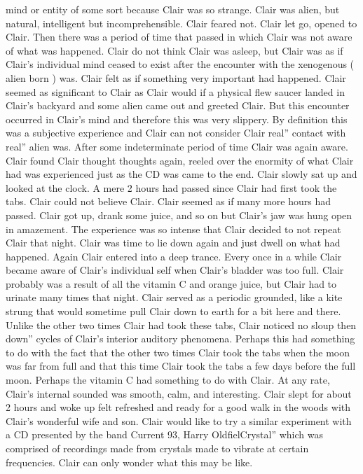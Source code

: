 \documentclass[12pt]{book}
\begin{document}
mind or entity of some sort because Clair was so strange. Clair was alien, but natural, intelligent but incomprehensible. Clair feared not. Clair let go, opened to Clair. Then there was a period of time that passed in which Clair was not aware of what was happened. Clair do not think Clair was asleep, but Clair was as if Clair's individual mind ceased to exist after the encounter with the xenogenous ( alien born ) was. Clair felt as if something very important had happened. Clair seemed as significant to Clair as Clair would if a physical flew saucer landed in Clair's backyard and some alien came out and greeted Clair. But this encounter occurred in Clair's mind and therefore this was very slippery. By definition this was a subjective experience and Clair can not consider Clair real'' contact with real'' alien was. After some indeterminate period of time Clair was again aware. Clair found Clair thought thoughts again, reeled over the enormity of what Clair had was experienced just as the CD was came to the end. Clair slowly sat up and looked at the clock. A mere 2  hours had passed since Clair had first took the tabs. Clair could not believe Clair. Clair seemed as if many more hours had passed. Clair got up, drank some juice, and so on but Clair's jaw was hung open in amazement. The experience was so intense that Clair decided to not repeat Clair that night. Clair was time to lie down again and just dwell on what had happened. Again Clair entered into a deep trance. Every once in a while Clair became aware of Clair's individual self when Clair's bladder was too full. Clair probably was a result of all the vitamin C and orange juice, but Clair had to urinate many times that night. Clair served as a periodic grounded, like a kite strung that would sometime pull Clair down to earth for a bit here and there. Unlike the other two times Clair had took these tabs, Clair noticed no sloup then down'' cycles of Clair's interior auditory phenomena. Perhaps this had something to do with the fact that the other two times Clair took the tabs when the moon was far from full and that this time Clair took the tabs a few days before the full moon. Perhaps the vitamin C had something to do with Clair. At any rate, Clair's internal sounded was smooth, calm, and interesting. Clair slept for about 2 hours and woke up felt refreshed and ready for a good walk in the woods with Clair's wonderful wife and son. Clair would like to try a similar experiment with a CD presented by the band Current 93, Harry OldfielCrystal'' which was comprised of recordings made from crystals made to vibrate at certain frequencies. Clair can only wonder what this may be like.
\end{document}
